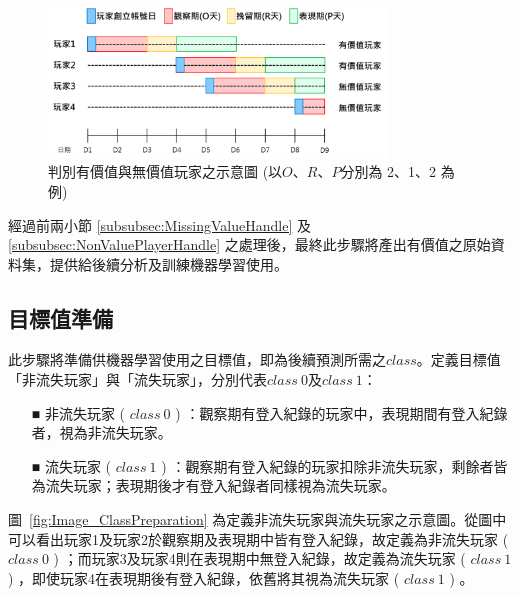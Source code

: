 \begin{figure}[!htb]
  \begin{center}
    \includegraphics[width=0.8\textwidth]{figures/Image_DataCleaning.png}
    \caption[判別有價值與無價值玩家之示意圖]{判別有價值與無價值玩家之示意圖 (以$O$、$R$、$P$分別為 2、1、2 為例) }
    \label{fig:Image_DataCleaning}
  \end{center}
\end{figure}

經過前兩小節 \ref{subsubsec:MissingValueHandle} 及 \ref{subsubsec:NonValuePlayerHandle} 之處理後，最終此步驟將產出有價值之原始資料集，提供給後續分析及訓練機器學習使用。

\subsection{目標值準備}
\label{subsec:ClassPreparation}

此步驟將準備供機器學習使用之目標值，即為後續預測所需之$class$。定義目標值「非流失玩家」與「流失玩家」，分別代表$class\ 0$及$class\ 1$：

\begin{itemize}
  \item [■] 非流失玩家 ( $class\ 0$ ) ：觀察期有登入紀錄的玩家中，表現期間有登入紀錄者，視為非流失玩家。
  \item [■] 流失玩家 ( $class\ 1$ ) ：觀察期有登入紀錄的玩家扣除非流失玩家，剩餘者皆為流失玩家；表現期後才有登入紀錄者同樣視為流失玩家。
\end{itemize}

圖~\ref{fig:Image_ClassPreparation} 為定義非流失玩家與流失玩家之示意圖。從圖中可以看出玩家1及玩家2於觀察期及表現期中皆有登入紀錄，故定義為非流失玩家 ( $class\ 0$ ) ；而玩家3及玩家4則在表現期中無登入紀錄，故定義為流失玩家 ( $class\ 1$ ) ，即使玩家4在表現期後有登入紀錄，依舊將其視為流失玩家 ( $class\ 1$ ) 。

